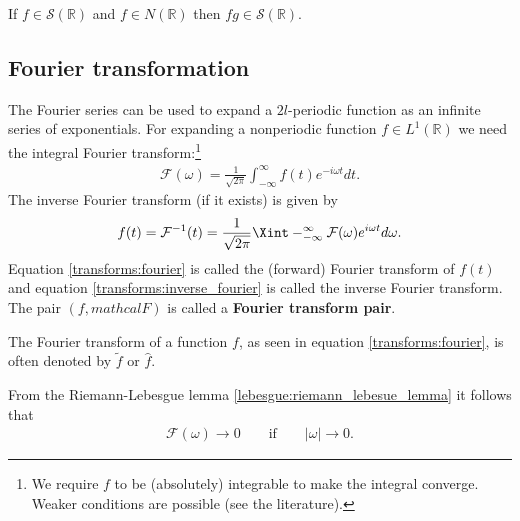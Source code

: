 	\begin{property}
		If $f\in\mathscr{S}(\mathbb{R})$ and $f\in N(\mathbb{R})$ then $fg\in\mathscr{S}(\mathbb{R})$.
	\end{property}

\subsection{Fourier transformation}

    The Fourier series can be used to expand a $2l$-periodic function as an infinite series of exponentials. For expanding a nonperiodic function $f\in L^1(\mathbb{R})$ we need the integral Fourier transform:\footnote{We require $f$ to be (absolutely) integrable to make the integral converge. Weaker conditions are possible (see the literature).}
    \begin{gather}
        \label{transforms:fourier}
        \mathcal{F}(\omega) = \frac{1}{\sqrt{2\pi}} \int_{-\infty}^{\infty}f(t)e^{-i\omega t}dt.
    \end{gather}
    The inverse Fourier transform (if it exists) is given by
    \begin{gather}
        \label{transforms:inverse_fourier}
        f(t) = \mathcal{F}^{-1}(t) = \frac{1}{\sqrt{2\pi}} \Xint-_{-\infty}^{\infty}\mathcal{F}(\omega)e^{i\omega t}d\omega.
    \end{gather}
    Equation \ref{transforms:fourier} is called the (forward) Fourier transform of $f(t)$ and equation \ref{transforms:inverse_fourier} is called the inverse Fourier transform. The pair $(f, mathcal{F})$ is called a \textbf{Fourier transform pair}.

    \begin{notation}
        The Fourier transform of a function $f$, as seen in equation \ref{transforms:fourier}, is often denoted by $\widetilde{f}$ or $\widehat{f}$.
    \end{notation}

    \begin{property}
        From the Riemann-Lebesgue lemma \ref{lebesgue:riemann_lebesue_lemma} it follows that
        \begin{gather}
            \mathcal{F}(\omega)\rightarrow0 \qquad\text{if}\qquad |\omega|\rightarrow0.
        \end{gather}
    \end{property}

